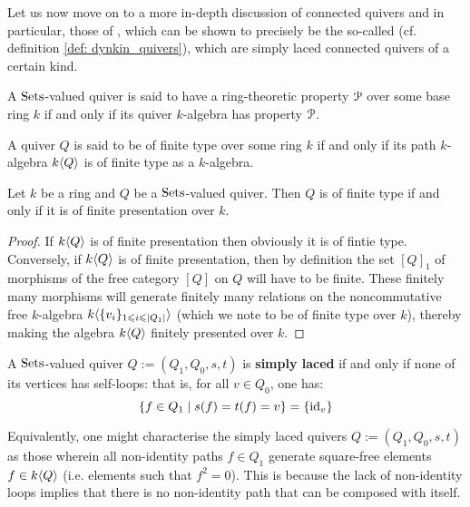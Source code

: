             Let us now move on to a more in-depth discussion of connected quivers and in particular, those of , which can be shown to precisely be the so-called  (cf. definition \ref{def: dynkin_quivers}), which are simply laced connected quivers of a certain kind. 
            \begin{definition}
                A $\mathrm{Sets}$-valued quiver is said to have a ring-theoretic property $\mathcal{P}$ over some base ring $k$ if and only if its quiver $k$-algebra has property $\mathcal{P}$.
            \end{definition}
            \begin{example}
                A quiver $Q$ is said to be of finite type over some ring $k$ if and only if its path $k$-algebra $k\langle Q\rangle$ is of finite type as a $k$-algebra.
            \end{example}
            \begin{proposition} \label{prop: quivers_of_finite_type_are_of_finite_presentations}
                Let $k$ be a ring and $Q$ be a $\mathrm{Sets}$-valued quiver. Then $Q$ is of finite type if and only if it is of finite presentation over $k$.
            \end{proposition}
                \begin{proof}
                    If $k\langle Q\rangle$ is of finite presentation then obviously it is of fintie type. Conversely, if $k\langle Q\rangle$ is of finite presentation, then by definition the set $[Q]_1$ of morphisms of the free category $[Q]$ on $Q$ will have to be finite. These finitely many morphisms will generate finitely many relations on the noncommutative free $k$-algebra $k\langle\{v_i\}_{1 \leqslant i \leqslant |Q_1|}\rangle$ (which we note to be of finite type over $k$), thereby making the algebra $k\langle Q\rangle$ finitely presented over $k$.
                \end{proof}
            \begin{definition} \label{def: simply_laced_quivers}
                A $\mathrm{Sets}$-valued quiver $Q := (Q_1, Q_0, s, t)$ is \textbf{simply laced} if and only if none of its vertices has self-loops: that is, for all $v \in Q_0$, one has:
                    $$\{f \in Q_1 \mid s(f) = t(f) = v\} = \{\mathrm{id}_v\}$$
            \end{definition}
            \begin{remark}
                Equivalently, one might characterise the simply laced quivers $Q := (Q_1, Q_0, s, t)$ as those wherein all non-identity paths $f \in Q_1$ generate square-free elements $f \in k\langle Q\rangle$ (i.e. elements such that $f^2 = 0$). This is because the lack of non-identity loops implies that there is no non-identity path that can be composed with itself. 
            \end{remark}
